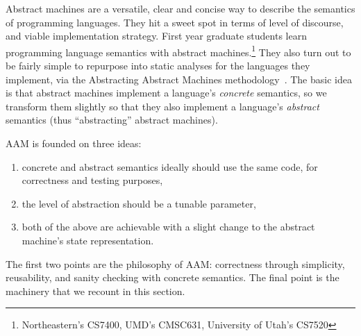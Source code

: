 Abstract machines are a versatile, clear and concise way to describe the semantics of programming languages.
%
They hit a sweet spot in terms of level of discourse, and viable implementation strategy.
%
First year graduate students learn programming language semantics with abstract machines.\footnote{Northeastern's CS7400, UMD's CMSC631, University of Utah's CS7520}
%
They also turn out to be fairly simple to repurpose into static analyses for the languages they implement, via the Abstracting Abstract Machines methodology~\citep{dvanhorn:VanHorn2010Abstracting}.
%
The basic idea is that abstract machines implement a language's \emph{concrete} semantics, so we transform them slightly so that they also implement a language's \emph{abstract} semantics (thus ``abstracting'' abstract machines).

AAM is founded on three ideas:
\begin{enumerate}
\item{concrete and abstract semantics ideally should use the same code, for correctness and testing purposes,}
\item{the level of abstraction should be a tunable parameter,}
\item{both of the above are achievable with a slight change to the abstract machine's state representation.}
\end{enumerate}

The first two points are the philosophy of AAM: correctness through simplicity, reusability, and sanity checking with concrete semantics.
%
The final point is the machinery that we recount in this section.

